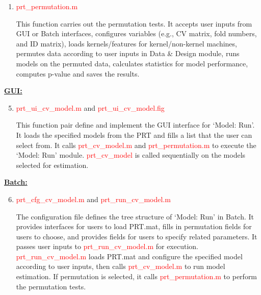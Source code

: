 \begin{enumerate}
\item \textcolor{red}{prt\_permutation.m}

This function carries out the permutation tests. It accepts user inputs from GUI or Batch interfaces, configures variables (e.g., CV matrix, fold numbers, and ID matrix), loads kernels/features for kernel/non-kernel machines, permutes data according to user inputs in Data \& Design module, runs models on the permuted data, calculates statistics for model performance, computes p-value  and saves the results.


\end{enumerate}


\noindent \textbf{\underline{GUI:}}

\begin{enumerate}
\setcounter{enumi}{4}


\item \textcolor{red}{prt\_ui\_cv\_model.m} and \textcolor{red}{prt\_ui\_cv\_model.fig}

This function pair define and implement the GUI interface for `Model: Run'. It loads the specified models from the PRT and fills a list that the user can select from. It calls \textcolor{red}{prt\_cv\_model.m} and \textcolor{red}{prt\_permutation.m} to execute the `Model: Run' module. \textcolor{red}{prt\_cv\_model} is called sequentially on the models selected for estimation.

\end{enumerate}

\noindent \textbf{\underline{Batch:}}

\begin{enumerate}
\setcounter{enumi}{5}

\item \textcolor{red}{prt\_cfg\_cv\_model.m} and \textcolor{red}{prt\_run\_cv\_model.m}

The configuration file defines the tree structure of `Model: Run' in Batch. It provides  interfaces for users to load PRT.mat, fills in permutation fields for users to choose, and provides fields for users to specify related parameters. It passes user inputs to \textcolor{red}{prt\_run\_cv\_model.m} for execution. \textcolor{red}{prt\_run\_cv\_model.m} loads PRT.mat and configure the specified model according to user inputs, then calls \textcolor{red}{prt\_cv\_model.m} to run model estimation. If permutation is selected, it calls \textcolor{red}{prt\_permutation.m} to perform the permutation tests.

\end{enumerate}


